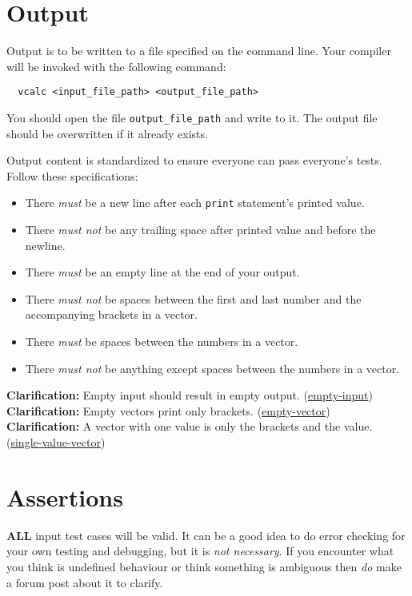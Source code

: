 \documentclass{article}
\newcommand{\code}[1]{\texttt{\textmd{#1}}}
\newcommand{\clarification}[2]{\textbf{Clarification: }#1 (\hyperlink{#2}{#2})}
\begin{document}
\section{Output}
Output is to be written to a file specified on the command line. Your compiler
will be invoked with the following command:
\begin{lstlisting}
  vcalc <input_file_path> <output_file_path>
\end{lstlisting}
You should open the file \code{output\_file\_path} and write to it. The output file should be
overwritten if it already exists.

Output content is standardized to ensure everyone can pass everyone's tests. Follow these
specifications:
\begin{itemize}
  \item
    There \textit{must} be a new line after each \code{print} statement's printed value.
  \item
    There \textit{must not} be any trailing space after printed value and before the newline.
  \item
    There \textit{must} be an empty line at the end of your output.
  \item
    There \textit{must not} be spaces between the first and last number and the accompanying
    brackets in a vector.
  \item
    There \textit{must} be spaces between the numbers in a vector.
  \item
    There \textit{must not} be anything except spaces between the numbers in a vector.
\end{itemize}

\clarification{Empty input should result in empty output.}{empty-input}\\
\clarification{Empty vectors print only brackets.}{empty-vector}\\
\clarification{A vector with one value is only the brackets and the value.}{single-value-vector}

\section{Assertions}
\textbf{ALL} input test cases will be valid. It can be a good idea to do error checking for your
own testing and debugging, but it is \textit{not necessary}. If you encounter what you think is
undefined behaviour or think something is ambiguous then \textit{do} make a forum post about it to
clarify.
\end{document}
